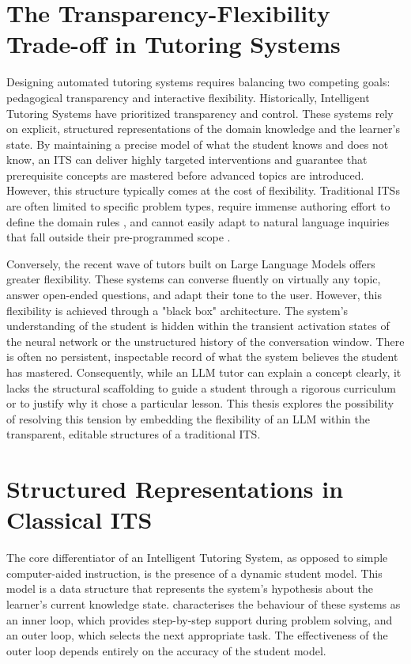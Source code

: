 \documentclass[logo,bsc,singlespacing,parskip,online]{infthesis}
\begin{document}
\section{The Transparency-Flexibility Trade-off in Tutoring Systems}

Designing automated tutoring systems requires balancing two competing goals: pedagogical transparency and interactive flexibility. Historically, Intelligent Tutoring Systems have prioritized transparency and control. These systems rely on explicit, structured representations of the domain knowledge and the learner's state. By maintaining a precise model of what the student knows and does not know, an ITS can deliver highly targeted interventions and guarantee that prerequisite concepts are mastered before advanced topics are introduced. However, this structure typically comes at the cost of flexibility. Traditional ITSs are often limited to specific problem types, require immense authoring effort to define the domain rules \citep{koedinger2004knowledge}, and cannot easily adapt to natural language inquiries that fall outside their pre-programmed scope \citep{murray1999authoring}.

Conversely, the recent wave of tutors built on Large Language Models offers greater flexibility. These systems can converse fluently on virtually any topic, answer open-ended questions, and adapt their tone to the user. However, this flexibility is achieved through a "black box" architecture. The system's understanding of the student is hidden within the transient activation states of the neural network or the unstructured history of the conversation window. There is often no persistent, inspectable record of what the system believes the student has mastered. Consequently, while an LLM tutor can explain a concept clearly, it lacks the structural scaffolding to guide a student through a rigorous curriculum or to justify why it chose a particular lesson. This thesis explores the possibility of resolving this tension by embedding the flexibility of an LLM within the transparent, editable structures of a traditional ITS.

\section{Structured Representations in Classical ITS}

The core differentiator of an Intelligent Tutoring System, as opposed to simple computer-aided instruction, is the presence of a dynamic student model. This model is a data structure that represents the system's hypothesis about the learner's current knowledge state. \citet{vanlehn2011relative} characterises the behaviour of these systems as an inner loop, which provides step-by-step support during problem solving, and an outer loop, which selects the next appropriate task. The effectiveness of the outer loop depends entirely on the accuracy of the student model.
\end{document}
